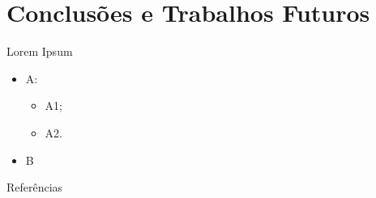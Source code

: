 \documentclass[10pt]{beamer}
\begin{document}
\section{Conclusões e Trabalhos Futuros}

\begin{frame}{Lorem Ipsum}
    \begin{itemize}
        \item<1 -> A:
        \begin{itemize}
            \item<2 -> A1;
            \item<2 -> A2.
        \end{itemize}
        \item<3 -> B
      \end{itemize}
\end{frame}

\begin{frame}[allowframebreaks]{Referências}

  
  

\end{frame}
\end{document}
